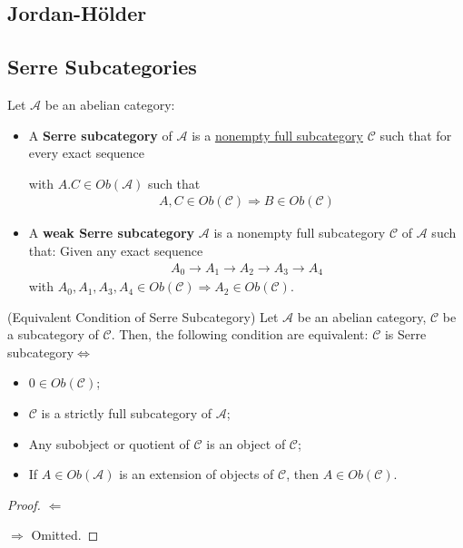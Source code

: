 \documentclass[Total.tex]{subfiles}
\begin{document}
				\subsection{Jordan-Hölder}
				\subsection{Serre Subcategories}
					\begin{Def}
						Let $\mathcal{A}$ be an abelian category:
						\begin{itemize}
							\item A \textbf{Serre subcategory} of $\mathcal{A}$ is a \underline{nonempty full subcategory} $\mathcal{C}$ such that for every exact sequence
							\begin{center}
							\end{center}
							with $A.C\in Ob(\mathcal{A})$ such that
							\begin{gather*}
								A,C\in Ob(\mathcal{C})\Rightarrow B\in Ob(\mathcal{C})
							\end{gather*}
							\item A \textbf{weak Serre subcategory} $\mathcal{A}$ is a nonempty full subcategory $\mathcal{C}$ of $\mathcal{A}$ such that: Given any exact sequence
							\begin{gather*}
								A_0\rightarrow A_1\rightarrow A_2\rightarrow A_3\rightarrow A_4
							\end{gather*}
							with $A_0,A_1,A_3,A_4\in Ob(\mathcal{C})\Rightarrow A_2\in Ob(\mathcal{C})$.
						\end{itemize}
					\end{Def}
					
					\begin{lemma}
						(Equivalent Condition of Serre Subcategory) Let $\mathcal{A}$ be an abelian category, $\mathcal{C}$ be a subcategory of $\mathcal{C}$. Then, the following condition are equivalent: $\mathcal{C}$ is Serre subcategory$\Leftrightarrow$ \begin{itemize}
							\item $0\in Ob(\mathcal{C})$;
							\item $\mathcal{C}$ is a strictly full subcategory of $\mathcal{A}$;
							\item Any subobject or quotient of $\mathcal{C}$ is an object of $\mathcal{C}$;
							\item If $A\in Ob(\mathcal{A})$ is an extension of objects of $\mathcal{C}$, then $A\in Ob(\mathcal{C})$.
						\end{itemize}
					\end{lemma}
					\begin{proof}
						$\Leftarrow$ 
						
						$\Rightarrow$ Omitted.
					\end{proof}
					
\end{document}
